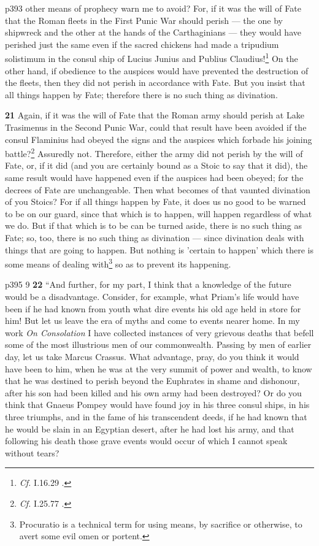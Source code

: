 p393 other means of prophecy warn me to avoid? For, if it was the will of Fate that the Roman fleets in the First Punic War should perish \texthebrew{—} the one by shipwreck and the other at the hands of the Carthaginians \texthebrew{—} they would have perished just the same even if the sacred chickens had made a tripudium solistimum in the consul ­ship of Lucius Junius and Publius Claudius!\texthebrew{}\footnote{\emph{Cf.}
I.16.29 .

} On the other hand, if obedience to the auspices would have prevented the destruction of the fleets, then they did not perish in accordance with Fate. But you insist that all things happen by Fate; therefore there is no such thing as divination.

\textbf{21} Again, if it was the will of Fate that the Roman army should perish at Lake Trasimenus in the Second Punic War, could that result have been avoided if the consul Flaminius had obeyed the signs and the auspices which forbade his joining battle?\texthebrew{}\footnote{\emph{Cf.}
I.25.77 .

} Assuredly not. Therefore, either the army did not perish by the will of Fate, or, if it did (and you are certainly bound as a Stoic to say that it did), the same result would have happened even if the auspices had been obeyed; for the decrees of Fate are unchangeable. Then what becomes of that vaunted divination of you Stoics? For if all things happen by Fate, it does us no good to be warned to be on our guard, since that which is to happen, will happen regardless of what we do. But if that which is to be can be turned aside, there is no such thing as Fate; so, too, there is no such thing as divination \texthebrew{—} since divination deals with things that are going to happen. But nothing is 'certain to happen' which there is some means of dealing with\texthebrew{}\footnote{Procuratio is a technical term for using means, by sacrifice or otherwise, to avert some evil omen or portent.

} so as to prevent its happening.

p395
9
\textbf{22} ``And further, for my part, I think that a knowledge of the future would be a disadvantage. Consider, for example, what Priam's life would have been if he had known from youth what dire events his old age held in store for him! But let us leave the era of myths and come to events nearer home. In my work \emph{On Consolation} I have collected instances of very grievous deaths that befell some of the most illustrious men of our commonwealth. Passing by men of earlier day, let us take Marcus Crassus. What advantage, pray, do you think it would have been to him, when he was at the very summit of power and wealth, to know that he was destined to perish beyond the Euphrates in shame and dishonour, after his son had been killed and his own army had been destroyed? Or do you think that Gnaeus Pompey would have found joy in his three consul ­ships, in his three triumphs, and in the fame of his transcendent deeds, if he had known that he would be slain in an Egyptian desert, after he had lost his army, and that following his death those grave events would occur of which I cannot speak without tears?

